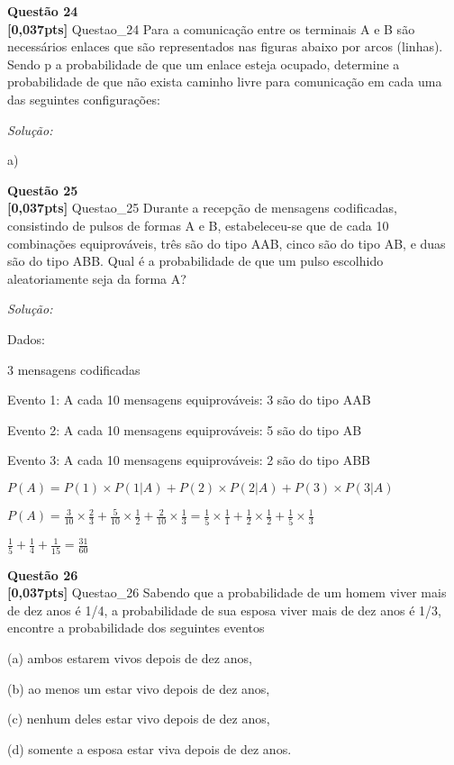 \documentclass{article}
\newenvironment{problem}[2][Questão]
    { \begin{mdframed}[backgroundcolor=gray!20] \textbf{#1 #2} \\}
    {  \end{mdframed}}
\newenvironment{solution}
    {\textit{Solução:}}
    {}
\begin{document}
\begin{problem}{24}
\textbf{[0,037pts]} Questao\_24 Para a comunicação entre os terminais A e B são necessários enlaces que são representados 
nas  figuras  abaixo  por  arcos (linhas).  Sendo  p  a  probabilidade  de  que  um  enlace  esteja 
ocupado, determine a probabilidade de que não exista caminho livre para comunicação em cada uma das 
seguintes configurações: 


\end{problem}

\begin{solution}

a)


\end{solution}

\begin{problem}{25}
\textbf{[0,037pts]} Questao\_25 Durante  a  recepção  de  mensagens  codificadas,  consistindo  de  pulsos  de  formas  A  e  B, estabeleceu-se que de cada 10 combinações equiprováveis, três são do tipo AAB, cinco são do 
tipo AB, e duas são do tipo ABB. Qual é a probabilidade de que um pulso escolhido aleatoriamente seja da forma A?
\end{problem}

\begin{solution}

Dados:

3 mensagens codificadas

Evento 1: A cada 10 mensagens equiprováveis: 3 são do tipo AAB

Evento 2: A cada 10 mensagens equiprováveis: 5 são do tipo AB

Evento 3: A cada 10 mensagens equiprováveis: 2 são do tipo ABB

$P(A) = P(1) \times P(1|A) + P(2) \times P(2|A) + P(3) \times P(3|A)$

$P(A) = \frac{3}{10} \times \frac{2}{3} + \frac{5}{10} \times \frac{1}{2} + \frac{2}{10} \times \frac{1}{3} = \frac{1}{5} \times \frac{1}{1} + \frac{1}{2} \times \frac{1}{2} + \frac{1}{5} \times \frac{1}{3}$

$\frac{1}{5} + \frac{1}{4} + \frac{1}{15} = \frac{31}{60}$



\end{solution}

\begin{problem}{26}
\textbf{[0,037pts]} Questao\_26 Sabendo que a probabilidade de um homem viver mais de dez anos é 1/4, a probabilidade 
de sua esposa viver mais de dez anos é 1/3, encontre a probabilidade dos seguintes eventos

(a) ambos estarem vivos depois de dez anos, 

(b) ao menos um estar vivo depois de dez anos, 

(c) nenhum deles estar vivo depois de dez anos, 

(d) somente a esposa estar viva depois de dez anos. 

\end{problem}
\end{document}
